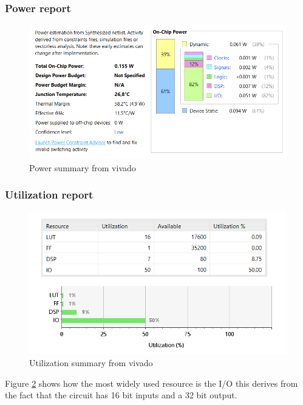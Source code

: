 \subsubsection{Power report} %
\label{ssub:power_report}
\begin{figure}[H]
  \centering
  \includegraphics[width=0.9\linewidth]{./images/power.PNG}
  \caption{Power summary from vivado}
  \label{fig:power}
\end{figure}

\subsubsection{Utilization report} %
\label{ssub:utilization_report}
\begin{figure}[H]
  \centering
  \includegraphics[width=0.9\linewidth]{./images/utilization.PNG}
  \caption{Utilization summary from vivado}
  \label{fig:utilization}
\end{figure}
Figure \ref{fig:utilization} shows how the most widely used resource is the I/O this derives from the fact that the circuit has 16 bit inputs and a 32 bit output.
